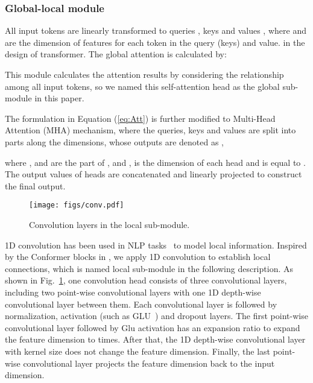 \documentclass[10pt,twocolumn,letterpaper]{article}
\begin{document}
\subsubsection{Global-local module}


{}
All  input tokens are linearly transformed to queries , keys  and values , where  and  are  the dimension of features for each token in the query (keys) and value.  in the design of transformer. The global attention is calculated by:

This module calculates the attention results by considering the relationship among all input tokens, so we named this self-attention head as the global sub-module in this paper.


The formulation in Equation (\ref{eq:Att}) is further modified to
Multi-Head Attention (MHA) mechanism,
where the queries, keys and values are split into  parts along the dimensions, whose outputs are denoted as , 

where ,  and  are the  part of ,  and ,  is the dimension of each head and is equal to .
The output values of  heads are concatenated and linearly projected to construct the final output.

\begin{figure}[t]
	\centering
	\texttt{[image: figs/conv.pdf]}\\
	\caption{Convolution layers in the local sub-module.}
	\label{fig:conv-module}
	 \vspace{-12pt}
\end{figure}

{}
1D convolution has been used in NLP tasks~\cite{conv-tranf-2,conformer} to model local information. Inspired by the Conformer blocks in \cite{conformer}, we apply 1D convolution to establish local connections, which is named local sub-module in the following description.
As shown in Fig.~\ref{fig:conv-module}, one convolution head consists of three convolutional layers, including two point-wise convolutional layers with one 1D depth-wise convolutional layer between them. Each convolutional layer is followed by normalization, activation (such as GLU~\cite{glu}) and dropout layers. The first point-wise convolutional layer followed by Glu activation has an expansion ratio  to expand the feature dimension to  times. After that, the 1D depth-wise convolutional layer with kernel size  does not change the feature dimension. Finally, the last point-wise convolutional layer projects the feature dimension back to the input dimension.
\end{document}
